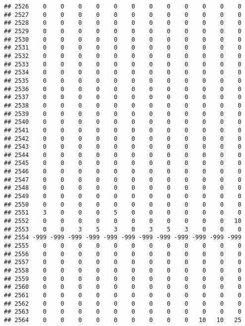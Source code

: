 \documentclass[]{article}
\begin{document}
\begin{verbatim}
## 2526    0    0    0    0    0    0    0    0    0    0    0    0
## 2527    0    0    0    0    0    0    0    0    0    0    0    0
## 2528    0    0    0    0    0    0    0    0    0    0    0    0
## 2529    0    0    0    0    0    0    0    0    0    0    0    0
## 2530    0    0    0    0    0    0    0    0    0    0    0    0
## 2531    0    0    0    0    0    0    0    0    0    0    0    0
## 2532    0    0    0    0    0    0    0    0    0    0    0    0
## 2533    0    0    0    0    0    0    0    0    0    0    0    0
## 2534    0    0    0    0    0    0    0    0    0    0    0    0
## 2535    0    0    0    0    0    0    0    0    0    0    0    0
## 2536    0    0    0    0    0    0    0    0    0    0    0    0
## 2537    0    0    0    0    0    0    0    0    0    0    0    0
## 2538    0    0    0    0    0    0    0    0    0    0    0    0
## 2539    0    0    0    0    0    0    0    0    0    0    0    0
## 2540    0    0    0    0    0    0    0    0    0    0    0    0
## 2541    0    0    0    0    0    0    0    0    0    0    0    0
## 2542    0    0    0    0    0    0    0    0    0    0    0    0
## 2543    0    0    0    0    0    0    0    0    0    0    0    0
## 2544    0    0    0    0    0    0    0    0    0    0    0    0
## 2545    0    0    0    0    0    0    0    0    0    0    0    0
## 2546    0    0    0    0    0    0    0    0    0    0    0    0
## 2547    0    0    0    0    0    0    0    0    0    0    0    0
## 2548    0    0    0    0    0    0    0    0    0    0    0    0
## 2549    0    0    0    0    0    0    0    0    0    0    0    0
## 2550    0    0    0    0    0    0    0    0    0    0    0    0
## 2551    3    0    0    0    5    0    0    0    0    0    0    0
## 2552    0    0    0    0    0    0    0    0    0    0    0   10
## 2553    0    0    3    5    3    0    3    5    3    0    0    0
## 2554 -999 -999 -999 -999 -999 -999 -999 -999 -999 -999 -999 -999
## 2555    0    0    0    0    0    0    0    0    0    0    0    0
## 2556    0    0    0    0    0    0    0    0    0    0    0    0
## 2557    0    0    0    0    0    0    0    0    0    0    0    0
## 2558    0    0    0    0    0    0    0    0    0    0    0    0
## 2559    0    0    0    0    0    0    0    0    0    0    0    0
## 2560    0    0    0    0    0    0    0    0    0    0    0    0
## 2561    0    0    0    0    0    0    0    0    0    0    0    0
## 2562    0    0    0    0    0    0    0    0    0    0    0    0
## 2563    0    0    0    0    0    0    0    0    0    0    0    0
## 2564    0    0    0    0    0    0    0    0    0   10   10   25

\end{verbatim}
\end{document}

